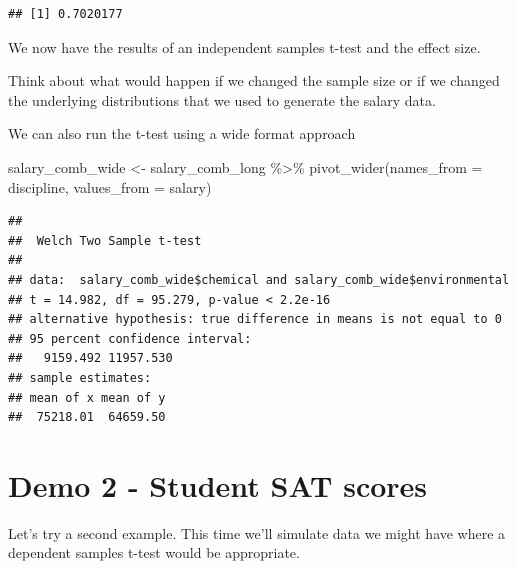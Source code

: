 \documentclass[
]{book}
\newenvironment{Shaded}{\begin{snugshade}}{\end{snugshade}}
\newcommand{\AttributeTok}[1]{\textcolor[rgb]{0.77,0.63,0.00}{#1}}
\newcommand{\ConstantTok}[1]{\textcolor[rgb]{0.00,0.00,0.00}{#1}}
\newcommand{\FunctionTok}[1]{\textcolor[rgb]{0.00,0.00,0.00}{#1}}
\newcommand{\NormalTok}[1]{#1}
\newcommand{\OtherTok}[1]{\textcolor[rgb]{0.56,0.35,0.01}{#1}}
\newcommand{\SpecialCharTok}[1]{\textcolor[rgb]{0.00,0.00,0.00}{#1}}
\begin{document}
\begin{verbatim}
## [1] 0.7020177
\end{verbatim}

We now have the results of an independent samples t-test and the effect size.

Think about what would happen if we changed the sample size or if we changed the underlying distributions that we used to generate the salary data.

We can also run the t-test using a wide format approach

\begin{Shaded}
\begin{Highlighting}[]
\NormalTok{salary\_comb\_wide }\OtherTok{\textless{}{-}}\NormalTok{ salary\_comb\_long }\SpecialCharTok{\%\textgreater{}\%} 
  \FunctionTok{pivot\_wider}\NormalTok{(}\AttributeTok{names\_from =}\NormalTok{ discipline, }\AttributeTok{values\_from =}\NormalTok{ salary)}
\end{Highlighting}
\end{Shaded}

\begin{Shaded}
\end{Shaded}

\begin{verbatim}
## 
##  Welch Two Sample t-test
## 
## data:  salary_comb_wide$chemical and salary_comb_wide$environmental
## t = 14.982, df = 95.279, p-value < 2.2e-16
## alternative hypothesis: true difference in means is not equal to 0
## 95 percent confidence interval:
##   9159.492 11957.530
## sample estimates:
## mean of x mean of y 
##  75218.01  64659.50
\end{verbatim}

\hypertarget{demo-2---student-sat-scores}{%
\section{Demo 2 - Student SAT scores}\label{demo-2---student-sat-scores}}

Let's try a second example. This time we'll simulate data we might have where a dependent samples t-test would be appropriate.
\end{document}
